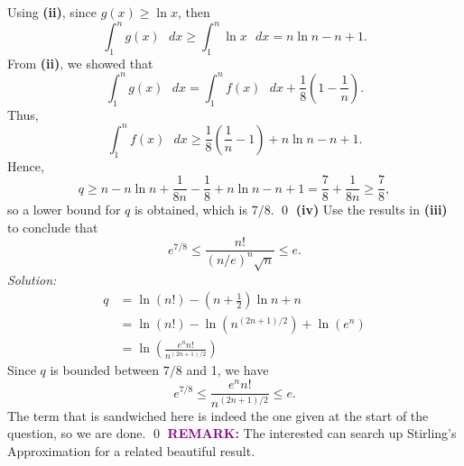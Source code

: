 \documentclass{article}
\begin{document}
\newline
\newline Using \textbf{(ii)}, since $g(x)\ge \operatorname{ln}x$, then \[\int_{1}^{n}g(x)\text{ }dx\ge \int_{1}^{n}\operatorname{ln}x\text{ }dx=n\operatorname{ln}n-n+1.\]
From \textbf{(ii)}, we showed that \[\int_{1}^{n}g(x)\text{ }dx=\int_{1}^{n}f(x)\text{ }dx+\frac{1}{8}\left(1-\frac{1}{n}\right).\]
Thus, \[\int_{1}^{n}f(x)\text{ }dx \ge \frac{1}{8}\left(\frac{1}{n}-1\right)+n\operatorname{ln}n-n+1.\] Hence, \[q \ge n-n\operatorname{ln}n+\frac{1}{8n}-\frac{1}{8}+n\operatorname{ln}n-n+1=\frac{7}{8}+\frac{1}{8n}\ge \frac{7}{8},\] so a lower bound for $q$ is obtained, which is $7/8$. \qed 
\newline
\newline
\textbf{(iv)} Use the results in \textbf{(iii)} to conclude that \[e^{7/8} \le \frac{n!}{(n/e)^n\sqrt{n}}\le e.\]
\textit{Solution:} \begin{align*}
   q&=\ln (n!)-\left( n+\frac{1}{2} \right)\ln n+n \\ 
 & =\ln (n!)-\ln \left( {{n}^{\left( 2n+1 \right)/2}} \right)+\ln \left( {{e}^{n}} \right) \\ 
 & =\ln \left( \frac{{{e}^{n}}n!}{{{n}^{\left( 2n+1 \right)/2}}} \right)  
\end{align*}
Since $q$ is bounded between $7/8$ and 1, we have \[e^{7/8} \le \frac{{{e}^{n}}n!}{{{n}^{\left( 2n+1 \right)/2}}} \le e.\]
The term that is sandwiched here is indeed the one given at the start of the question, so we are done. \qed 
\newline
\newline \textbf{\textcolor{purple}{REMARK:}} The interested can search up Stirling's Approximation for a related beautiful result.
\newpage
\end{document}
